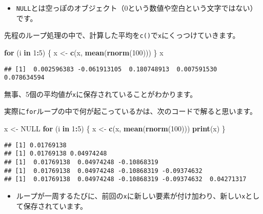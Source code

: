\documentclass[]{bxjsarticle}
\newenvironment{Shaded}{\begin{snugshade}}{\end{snugshade}}
\newcommand{\ControlFlowTok}[1]{\textcolor[rgb]{0.13,0.29,0.53}{\textbf{#1}}}
\newcommand{\DecValTok}[1]{\textcolor[rgb]{0.00,0.00,0.81}{#1}}
\newcommand{\KeywordTok}[1]{\textcolor[rgb]{0.13,0.29,0.53}{\textbf{#1}}}
\newcommand{\NormalTok}[1]{#1}
\newcommand{\OperatorTok}[1]{\textcolor[rgb]{0.81,0.36,0.00}{\textbf{#1}}}
\newcommand{\OtherTok}[1]{\textcolor[rgb]{0.56,0.35,0.01}{#1}}
\newcommand{\StringTok}[1]{\textcolor[rgb]{0.31,0.60,0.02}{#1}}
\providecommand{\tightlist}{%
  \setlength{\itemsep}{0pt}\setlength{\parskip}{0pt}}
\begin{document}
\begin{itemize}
\tightlist
\item
  \texttt{NULL}とは空っぽのオブジェクト（0という数値や空白という文字ではない）です。
\end{itemize}

先程のループ処理の中で、計算した平均を\texttt{c()}で\texttt{x}にくっつけていきます。

\begin{Shaded}
\begin{Highlighting}[]
\ControlFlowTok{for}\NormalTok{ (i }\ControlFlowTok{in} \DecValTok{1}\OperatorTok{:}\DecValTok{5}\NormalTok{) \{}
\NormalTok{  x <-}\StringTok{ }\KeywordTok{c}\NormalTok{(x, }\KeywordTok{mean}\NormalTok{(}\KeywordTok{rnorm}\NormalTok{(}\DecValTok{100}\NormalTok{)))}
\NormalTok{\}}
\NormalTok{x}
\end{Highlighting}
\end{Shaded}

\begin{verbatim}
## [1]  0.002596383 -0.061913105  0.180748913  0.007591530  0.078634594
\end{verbatim}

無事、5個の平均値が\texttt{x}に保存されていることがわかります。

実際に\texttt{for}ループの中で何が起こっているかは、次のコードで解ると思います。

\begin{Shaded}
\begin{Highlighting}[]
\NormalTok{x <-}\StringTok{ }\OtherTok{NULL}
\ControlFlowTok{for}\NormalTok{ (i }\ControlFlowTok{in} \DecValTok{1}\OperatorTok{:}\DecValTok{5}\NormalTok{) \{}
\NormalTok{  x <-}\StringTok{ }\KeywordTok{c}\NormalTok{(x, }\KeywordTok{mean}\NormalTok{(}\KeywordTok{rnorm}\NormalTok{(}\DecValTok{100}\NormalTok{)))}
  \KeywordTok{print}\NormalTok{(x)}
\NormalTok{\}}
\end{Highlighting}
\end{Shaded}

\begin{verbatim}
## [1] 0.01769138
## [1] 0.01769138 0.04974248
## [1]  0.01769138  0.04974248 -0.10868319
## [1]  0.01769138  0.04974248 -0.10868319 -0.09374632
## [1]  0.01769138  0.04974248 -0.10868319 -0.09374632  0.04271317
\end{verbatim}

\begin{itemize}
\tightlist
\item
  ループが一周するたびに、前回の\texttt{x}に新しい要素が付け加わり、新しい\texttt{x}として保存されています。
\end{itemize}
\end{document}
